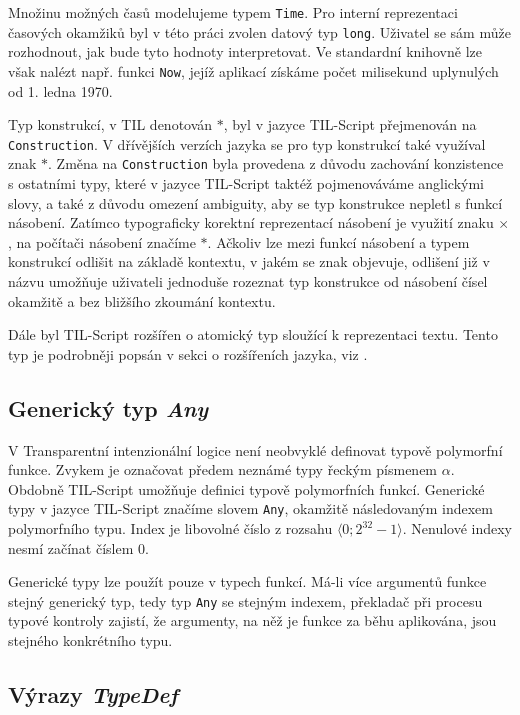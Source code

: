 Množinu možných časů modelujeme typem \lstinline{Time}. Pro interní reprezentaci časových okamžiků
byl v této práci zvolen datový typ \lstinline{long}. Uživatel se sám může rozhodnout, jak bude tyto
hodnoty interpretovat. Ve standardní knihovně lze však nalézt např. funkci \lstinline{Now}, jejíž
aplikací získáme počet milisekund uplynulých od 1. ledna 1970.

Typ konstrukcí, v TIL denotován $*$, byl v jazyce TIL-Script přejmenován
na \lstinline{Construction}. V dřívějších verzích jazyka se pro typ konstrukcí také využíval znak
$*$\cite{vyletelek}. Změna na \lstinline{Construction} byla provedena z důvodu zachování konzistence
s ostatními typy, které v jazyce TIL-Script taktéž pojmenováváme anglickými slovy, a také z důvodu
omezení ambiguity, aby se typ konstrukce nepletl s funkcí násobení. Zatímco typograficky korektní
reprezentací násobení je využití znaku $\times$, na počítači násobení značíme $*$. Ačkoliv lze mezi
funkcí násobení a typem konstrukcí odlišit na základě kontextu, v jakém se znak objevuje, odlišení
již v názvu umožňuje uživateli jednoduše rozeznat typ konstrukce od násobení čísel okamžitě a
bez bližšího zkoumání kontextu.

Dále byl TIL-Script rozšířen o atomický typ sloužící k reprezentaci textu. Tento typ je podrobněji
popsán v sekci o rozšířeních jazyka, viz .

\subsection{Generický typ \textit{Any}}

V Transparentní intenzionální logice není neobvyklé definovat typově polymorfní funkce. Zvykem je
označovat předem neznámé typy řeckým písmenem $\alpha$. Obdobně TIL-Script umožňuje definici
typově polymorfních funkcí. Generické typy v jazyce TIL-Script značíme slovem \lstinline{Any},
okamžitě následovaným indexem polymorfního typu. Index je libovolné číslo z rozsahu
$\bigl \langle 0; 2^{32}-1 \bigr \rangle$. Nenulové indexy nesmí začínat číslem 0.

Generické typy lze použít pouze v typech funkcí. Má-li více argumentů funkce stejný generický
typ, tedy typ \lstinline{Any} se stejným indexem, překladač při procesu typové kontroly zajistí,
že argumenty, na něž je funkce za běhu aplikována, jsou stejného konkrétního typu.

\subsection{Výrazy \textit{TypeDef}}

